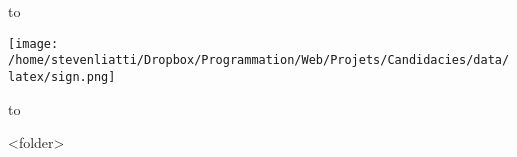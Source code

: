 \bigbreak
\bigbreak
\bigbreak
\bigbreak

\hbox to 
\begin{flushright}
\texttt{[image: /home/stevenliatti/Dropbox/Programmation/Web/Projets/Candidacies/data/latex/sign.png]}
\end{flushright}

\hbox to 

\bigbreak
\bigbreak

<folder>

